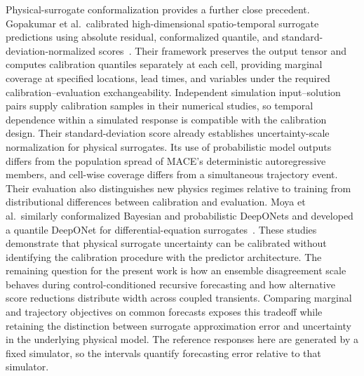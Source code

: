Physical-surrogate conformalization provides a further close precedent. Gopakumar et al.\ calibrated high-dimensional spatio-temporal surrogate predictions using absolute residual, conformalized quantile, and standard-deviation-normalized scores~\cite{gopakumar2026surrogates}. Their framework preserves the output tensor and computes calibration quantiles separately at each cell, providing marginal coverage at specified locations, lead times, and variables under the required calibration--evaluation exchangeability. Independent simulation input--solution pairs supply calibration samples in their numerical studies, so temporal dependence within a simulated response is compatible with the calibration design. Their standard-deviation score already establishes uncertainty-scale normalization for physical surrogates. Its use of probabilistic model outputs differs from the population spread of MACE's deterministic autoregressive members, and cell-wise coverage differs from a simultaneous trajectory event. Their evaluation also distinguishes new physics regimes relative to training from distributional differences between calibration and evaluation. Moya et al.\ similarly conformalized Bayesian and probabilistic DeepONets and developed a quantile DeepONet for differential-equation surrogates~\cite{moya2025deeponet}. These studies demonstrate that physical surrogate uncertainty can be calibrated without identifying the calibration procedure with the predictor architecture. The remaining question for the present work is how an ensemble disagreement scale behaves during control-conditioned recursive forecasting and how alternative score reductions distribute width across coupled transients. Comparing marginal and trajectory objectives on common forecasts exposes this tradeoff while retaining the distinction between surrogate approximation error and uncertainty in the underlying physical model. The reference responses here are generated by a fixed simulator, so the intervals quantify forecasting error relative to that simulator.

